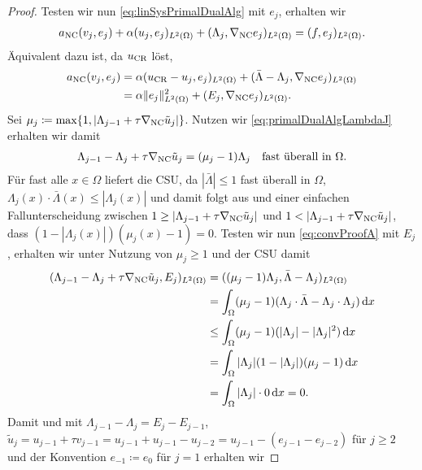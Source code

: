 \begin{proof}
  Testen wir nun \eqref{eq:linSysPrimalDualAlg} mit $e_j$, erhalten wir
  \begin{align*}
    a_\textup{NC}(v_j,e_j) + \alpha(u_j,e_j)_{L^2(\Omega)} 
    + (\Lambda_j,\nabla_\textup{NC} e_j)_{L^2(\Omega)}
    = 
    (f,e_j)_{L^2(\Omega)}.
  \end{align*}
  Äquivalent dazu ist, da $u_\textup{CR}$  löst, 
  \begin{align}
    \label{eq:convProofE}
    a_\textup{NC}(v_j,e_j) &= 
    \alpha(u_\textup{CR}-u_j,e_j)_{L^2(\Omega)} 
    + (\bar\Lambda-\Lambda_j,\nabla_\textup{NC} e_j)_{L^2(\Omega)} \notag\\
    &= 
    \alpha\Vert e_j\Vert_{L^2(\Omega)}^2
    + (E_j,\nabla_\textup{NC} e_j)_{L^2(\Omega)}.
  \end{align}
  Sei $\mu_j\coloneqq \max\{1,|\Lambda_{j-1}+\tau
  \nabla_\textup{NC} \tilde{u}_j|\}$.
  Nutzen wir \eqref{eq:primalDualAlgLambdaJ} erhalten wir damit
  \begin{align}
    \label{eq:convProofA}
    \Lambda_{j-1}-\Lambda_j+\tau \nabla_\textup{NC} \tilde{u}_j 
    = (\mu_j-1)\Lambda_j \quad\text{fast überall in }\Omega.
  \end{align}
  Für fast alle $x\in\Omega$ liefert die CSU, da $|\bar\Lambda|\leq 1$ fast
  überall in $\Omega$,
  $\Lambda_j(x)\cdot\bar\Lambda(x)\leq|\Lambda_j(x)|$ und damit folgt 
  aus  und einer einfachen Fallunterscheidung
  zwischen $1\geq |\Lambda_{j-1}+\tau\nabla_\textup{NC} \tilde{u}_j|$ und
  $1< |\Lambda_{j-1}+\tau\nabla_\textup{NC} \tilde{u}_j|$,
  dass $(1-|\Lambda_j(x)|)(\mu_j(x)-1)=0$.
  Testen wir nun \eqref{eq:convProofA} mit $E_j$, erhalten wir 
  unter Nutzung von $\mu_j\geq 1$ und der CSU damit
  \begin{align*}
    ( \Lambda_{j-1}-\Lambda_j+\tau\nabla_\textup{NC} \tilde{u}_j,
    E_j)_{L^2(\Omega)}
    &= 
    ( (\mu_j-1)\Lambda_j,\bar\Lambda-\Lambda_j)_{L^2(\Omega)}\\
    &=
    \int_\Omega
    (\mu_j-1)(\Lambda_j\cdot\bar\Lambda-\Lambda_j\cdot\Lambda_j)\,\mathrm dx\\
    &\leq
    \int_\Omega (\mu_j-1)(|\Lambda_j|-|\Lambda_j|^2)\,\mathrm dx\\
    &=
    \int_\Omega |\Lambda_j|
    (1-|\Lambda_j|)(\mu_j-1)\,\mathrm dx \\
    &=
    \int_\Omega |\Lambda_j|\cdot
    0\,\mathrm dx =0.
  \end{align*}
  Damit und mit $\Lambda_{j-1}-\Lambda_j=E_j-E_{j-1}$, 
  $\tilde{u}_j=u_{j-1}+\tau v_{j-1}=u_{j-1}+u_{j-1}-u_{j-2}=
  u_{j-1}-(e_{j-1}-e_{j-2})$
  für $j\geq 2$ und der Konvention $e_{-1}\coloneqq e_0$ für $j=1$ erhalten wir

\end{proof}
